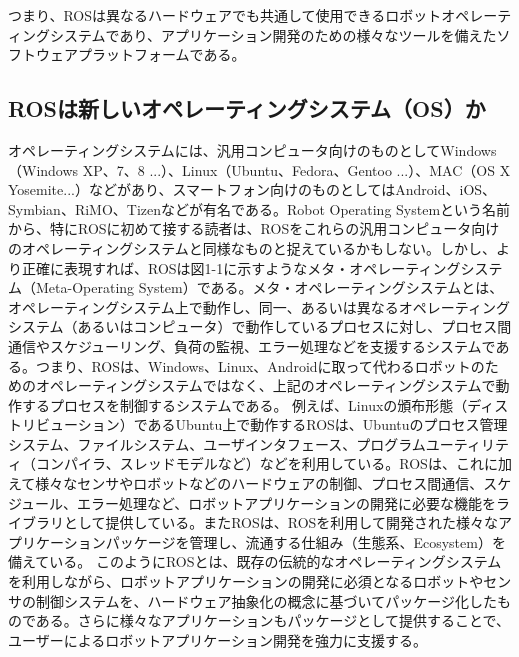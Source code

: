 つまり、ROSは異なるハードウェアでも共通して使用できるロボットオペレーティングシステムであり、アプリケーション開発のための様々なツールを備えたソフトウェアプラットフォームである。

\subsection{ROSは新しいオペレーティングシステム（OS）か}

オペレーティングシステムには、汎用コンピュータ向けのものとしてWindows（Windows XP、7、8 ...）、Linux（Ubuntu、Fedora、Gentoo ...）、MAC（OS X Yosemite...）などがあり、スマートフォン向けのものとしてはAndroid、iOS、Symbian、RiMO、Tizenなどが有名である。Robot Operating Systemという名前から、特にROSに初めて接する読者は、ROSをこれらの汎用コンピュータ向けのオペレーティングシステムと同様なものと捉えているかもしない。しかし、より正確に表現すれば、ROSは図1-1に示すようなメタ・オペレーティングシステム（Meta-Operating System）である。メタ・オペレーティングシステムとは、オペレーティングシステム上で動作し、同一、あるいは異なるオペレーティングシステム（あるいはコンピュータ）で動作しているプロセスに対し、プロセス間通信やスケジューリング、負荷の監視、エラー処理などを支援するシステムである。つまり、ROSは、Windows、Linux、Androidに取って代わるロボットのためのオペレーティングシステムではなく、上記のオペレーティングシステムで動作するプロセスを制御するシステムである。
例えば、Linuxの頒布形態（ディストリビューション）であるUbuntu上で動作するROSは、Ubuntuのプロセス管理システム、ファイルシステム、ユーザインタフェース、プログラムユーティリティ（コンパイラ、スレッドモデルなど）などを利用している。ROSは、これに加えて様々なセンサやロボットなどのハードウェアの制御、プロセス間通信、スケジュール、エラー処理など、ロボットアプリケーションの開発に必要な機能をライブラリとして提供している。またROSは、ROSを利用して開発された様々なアプリケーションパッケージを管理し、流通する仕組み（生態系、Ecosystem）を備えている。
このようにROSとは、既存の伝統的なオペレーティングシステムを利用しながら、ロボットアプリケーションの開発に必須となるロボットやセンサの制御システムを、ハードウェア抽象化の概念に基づいてパッケージ化したものである。さらに様々なアプリケーションもパッケージとして提供することで、ユーザーによるロボットアプリケーション開発を強力に支援する。

